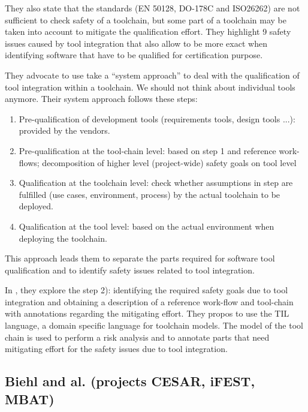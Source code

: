 They also state that the standards (EN 50128, DO-178C and ISO26262)
are not sufficient to check safety of a toolchain, but some part of a
toolchain may be taken into account to mitigate the qualification
effort. 
They highlight 9 safety issues caused by tool integration that also
allow to be more exact when identifying software that have to be
qualified for certification purpose. 

They advocate to use take a ``system approach''  to deal with the qualification of tool integration within a toolchain. We should not
think about individual tools anymore.  Their system approach follows these steps:

\begin{enumerate}
\item Pre-qualification of development tools (requirements tools, design
  tools ...): provided by the vendors.
\item Pre-qualification at the tool-chain level: based on step 1 and
  reference work-flows; decomposition of higher level (project-wide) safety goals on tool level
\item Qualification at the toolchain level: check whether assumptions in step are fulfilled (use cases, environment, process) by the actual toolchain to be deployed.
\item Qualification at the tool level: based on the actual environment
  when deploying the toolchain.
\end{enumerate}
This approach leads them to separate the parts required for software tool
qualification and to identify safety issues related to tool integration.

In \cite{asplund_towards_2012}, they explore the step 2): identifying
the required safety goals due to tool integration and obtaining a
description of a reference work-flow and tool-chain with annotations regarding the mitigating effort.  They propos to use the TIL language, a
domain specific language for toolchain models.  The model of the tool
chain is used to perform a risk analysis and to annotate parts
that need mitigating effort for the safety issues due to tool
integration. 

\subsection{Biehl and al. (projects CESAR, iFEST, MBAT)}
\label{sec:biehl-approach}

